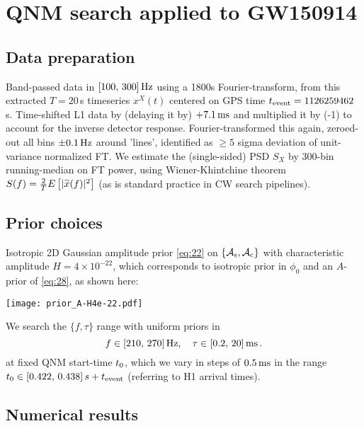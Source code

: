 \documentclass[aps,prd,onecolumn,notitlepage,nofootinbib,superscriptaddress,altaffilletter,floatfix]{revtex4-1}
\begin{document}
\section{QNM search applied to GW150914}
\label{sec:qnm-search-applied}

\subsection{Data preparation}
\label{sec:data-preparation}

Band-passed data in $[100,\,300]\,\mathrm{Hz}$ using a 1800s Fourier-transform, from this extracted $T=20\,$s timeseries $x^X(t)$ centered on GPS time $t_{\mathrm{event}} =
1126259462\,$s. Time-shifted L1 data by (delaying it by) $+7.1\,\mathrm{ms}$ and multiplied it by (-1) to account for the inverse detector response.
Fourier-transformed this again, zeroed-out all bins $\pm0.1\,\mathrm{Hz}$ around 'lines', identified as $\ge 5$ sigma deviation of unit-variance normalized
FT.
We estimate the (single-sided) PSD $S_X$ by 300-bin running-median on FT power, using Wiener-Khintchine theorem
$S(f) = \frac{2}{T} E\left[|\widetilde{x}(f)|^2\right]$ (as is standard practice in CW search pipelines).

\subsection{Prior choices}
\label{sec:prior-choices}

Isotropic 2D Gaussian amplitude prior \eqref{eq:22} on $\{\mathcal{A}_{\mathrm{s}},\mathcal{A}_{\mathrm{c}}\}$ with characteristic amplitude $H = 4\times10^{-22}$, which corresponds to
isotropic prior in $\phi_0$ and an $A$-prior of \eqref{eq:28}, as shown here:\\
\parbox{\textwidth}{
  \centering
  \texttt{[image: prior\_A-H4e-22.pdf]}
}

We search the $\{f,\tau\}$ range with uniform priors in
\begin{equation}
  \label{eq:33}
  f\in[210,\,270]\,\mathrm{Hz},\quad
  \tau\in[0.2,\,20]\,\mathrm{ms}\,.
\end{equation}
at fixed QNM start-time $t_0$, which we vary in steps of $0.5\,\mathrm{ms}$ in the range $t_0\in [0.422,\,0.438]\,s + t_{\mathrm{event}}$ (referring to H1
arrival times).

\newpage
\subsection{Numerical results}
\label{sec:numerical-results}
\end{document}
